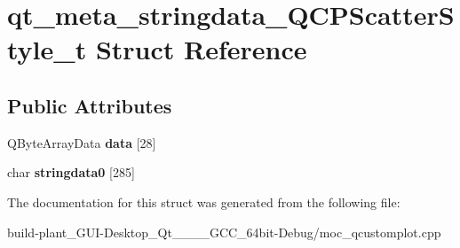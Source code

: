 \hypertarget{structqt__meta__stringdata__QCPScatterStyle__t}{}\section{qt\+\_\+meta\+\_\+stringdata\+\_\+\+Q\+C\+P\+Scatter\+Style\+\_\+t Struct Reference}
\label{structqt__meta__stringdata__QCPScatterStyle__t}
\subsection*{Public Attributes}
\begin{DoxyCompactItemize}
\item 
\mbox{\label{structqt__meta__stringdata__QCPScatterStyle__t_acb6d48bc3c9529aa0eecc8d37930f3c6}} 
Q\+Byte\+Array\+Data {\bfseries data} \mbox{[}28\mbox{]}
\item 
\mbox{\label{structqt__meta__stringdata__QCPScatterStyle__t_a6689ed585bd8409634a978fad9b94c3a}} 
char {\bfseries stringdata0} \mbox{[}285\mbox{]}
\end{DoxyCompactItemize}


The documentation for this struct was generated from the following file\+:\begin{DoxyCompactItemize}
\item 
build-\/plant\+\_\+\+G\+U\+I-\/\+Desktop\+\_\+\+Qt\+\_\+\_\+\_\+\_\+\+G\+C\+C\+\_\+64bit-\/\+Debug/moc\+\_\+qcustomplot.\+cpp\end{DoxyCompactItemize}
